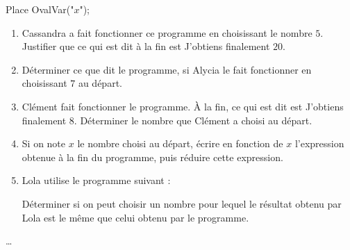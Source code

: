 \begin{exercice*}
\begin{minipage}{0.35\linewidth}
{{        \smallskip
        \begin{Scratch}[Echelle=0.7]
            Place OvalVar("$x$");
        \end{Scratch}
        }
        }
    \end{minipage}
    \begin{enumerate}
        \item Cassandra a fait fonctionner ce programme en choisissant le nombre $5$. Justifier que ce qui est dit à la fin est \og{} J'obtiens finalement $20$\fg{}.
        \item Déterminer ce que dit le programme, si Alycia le fait fonctionner en choisissant $7$ au départ.
        \item Clément fait fonctionner le programme. À la fin, ce qui est dit est \og{} J'obtiens finalement $8$\fg{}. Déterminer le nombre que Clément a choisi au départ.
        \item Si on note $x$ le nombre choisi au départ, écrire en fonction de $x$ l'expression obtenue à la fin du programme, puis réduire cette expression.
        \item Lola utilise le programme suivant :
        

        Déterminer si on peut choisir un nombre pour lequel le résultat obtenu par Lola est le même que celui obtenu par le programme.
    \end{enumerate}
\end{exercice*}
\begin{corrige}
    \dots
\end{corrige}

